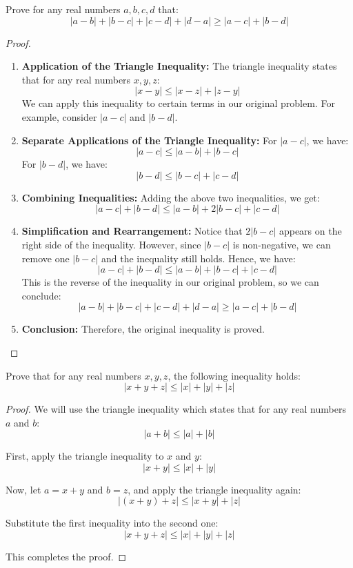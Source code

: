 \documentclass[
	12pt, %
	fleqn, %
	a4paper, %
]{LegrandOrangeBook}
\begin{document}
\begin{exercise}
    Prove for any real numbers \( a, b, c, d \) that:
\[ |a - b| + |b - c| + |c - d| + |d - a| \geq |a - c| + |b - d| \]

\end{exercise}

\begin{proof}
    \begin{enumerate}
    \item \textbf{Application of the Triangle Inequality:}
    The triangle inequality states that for any real numbers \( x, y, z \):
    \[ |x - y| \leq |x - z| + |z - y| \]
    We can apply this inequality to certain terms in our original problem. For example, consider \( |a - c| \) and \( |b - d| \).

    \item \textbf{Separate Applications of the Triangle Inequality:}
    For \( |a - c| \), we have:
    \[ |a - c| \leq |a - b| + |b - c| \]
    For \( |b - d| \), we have:
    \[ |b - d| \leq |b - c| + |c - d| \]

    \item \textbf{Combining Inequalities:}
    Adding the above two inequalities, we get:
    \[ |a - c| + |b - d| \leq |a - b| + 2|b - c| + |c - d| \]

    \item \textbf{Simplification and Rearrangement:}
    Notice that \( 2|b - c| \) appears on the right side of the inequality. However, since \( |b - c| \) is non-negative, we can remove one \( |b - c| \) and the inequality still holds. Hence, we have:
    \[ |a - c| + |b - d| \leq |a - b| + |b - c| + |c - d| \]
    This is the reverse of the inequality in our original problem, so we can conclude:
    \[ |a - b| + |b - c| + |c - d| + |d - a| \geq |a - c| + |b - d| \]

    \item \textbf{Conclusion:}
    Therefore, the original inequality is proved.
\end{enumerate}
\end{proof}
\begin{exercise}
    Prove that for any real numbers \( x, y, z \), the following inequality holds:
\[ |x + y + z| \leq |x| + |y| + |z| \]

\end{exercise}
\begin{proof}
    We will use the triangle inequality which states that for any real numbers \( a \) and \( b \):
\[ |a + b| \leq |a| + |b| \]

First, apply the triangle inequality to \( x \) and \( y \):
\[ |x + y| \leq |x| + |y| \]

Now, let \( a = x + y \) and \( b = z \), and apply the triangle inequality again:
\[ |(x + y) + z| \leq |x + y| + |z| \]

Substitute the first inequality into the second one:
\[ |x + y + z| \leq |x| + |y| + |z| \]

This completes the proof.
\end{proof}
\end{document}

